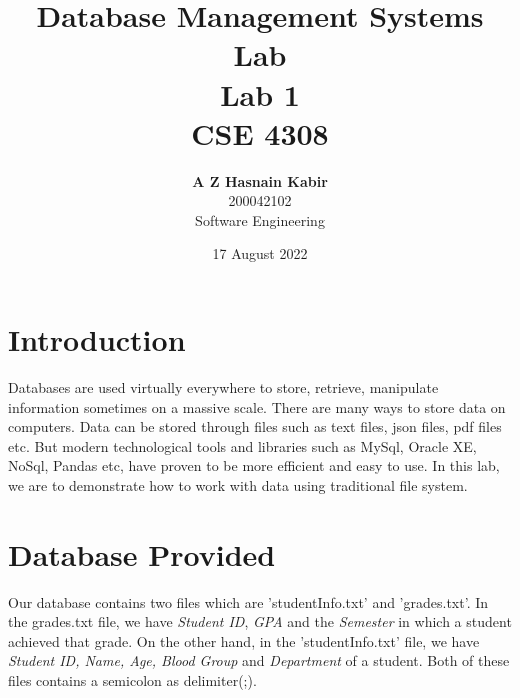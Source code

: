 \documentclass[a4paper, left=1in, right=1in,12pt]{article}
\title{Database Management Systems Lab\\Lab 1\\CSE 4308}
\author{\textbf{\Large A Z Hasnain Kabir}\\\Large 200042102\\\Large Software Engineering}
\date{17 August 2022}
\begin{document}
\maketitle

\section*{\large Introduction}
Databases are used virtually everywhere to store, retrieve, manipulate information sometimes on a massive scale. There are many ways to store data on computers. Data can be stored through files such as text files, json files, pdf files etc. But modern technological tools and libraries such as MySql, Oracle XE, NoSql, Pandas etc, have proven to be more efficient and easy to use. In this lab, we are to demonstrate how to work with data using traditional file system.
\section*{\large Database Provided}
Our database contains two files which are 'studentInfo.txt' and 'grades.txt'. In the grades.txt file, we have \textit{Student ID}, \textit{GPA} and the \textit{Semester} in which a student achieved that grade. On the other hand, in the 'studentInfo.txt' file, we have \textit{Student ID, Name, Age, Blood Group} and \textit{Department} of a student. Both of these files contains a semicolon as delimiter(;). 
\end{document}
